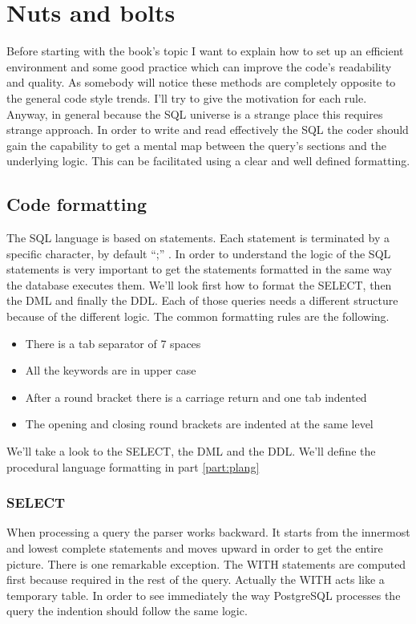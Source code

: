 \chapter{Nuts and bolts}
Before starting with the book's topic I want to explain how to set up an
efficient environment and some good practice which can improve the code's readability and quality.
As somebody will notice these methods are completely opposite to the general code style trends. I'll 
try to give the motivation for each rule. Anyway, in general because the SQL universe is a strange 
place this requires strange approach. In order to write and read effectively the SQL the coder should gain 
the capability to get a mental map  between the query's sections and the underlying logic. This can be 
facilitated using a clear and well defined formatting.\newline

\section{Code formatting}
\label{sec:codeformat}
The SQL language is based on statements. Each statement is terminated by a specific character, by default ``;'' . 
In order to understand the logic of the SQL statements is very important to get the statements formatted in the same 
way the database executes them. We'll look first how to format the SELECT, then the DML and finally the DDL. Each of 
those queries needs a different structure because of the different logic. The common formatting rules are the following.

\begin{itemize}
 \item There is a tab separator of 7 spaces
 \item All the keywords are in upper case
 \item After a round bracket there is a carriage return and one tab indented 
 \item The opening and closing round brackets are indented at the same level
\end{itemize}

We'll take a look to the SELECT, the DML and the DDL. We'll define the procedural language formatting in part 
\ref{part:plang}


\subsection{SELECT}
\label{sub:FRMSELECT}
When processing a query the parser works backward. It starts from the innermost and lowest complete statements and 
moves upward in order to get the entire picture. There is one remarkable exception. The WITH statements are computed 
first because required in the rest of the query. Actually the WITH acts like a temporary table. In order to see 
immediately the way PostgreSQL processes the query the indention should follow the same logic. \newline


